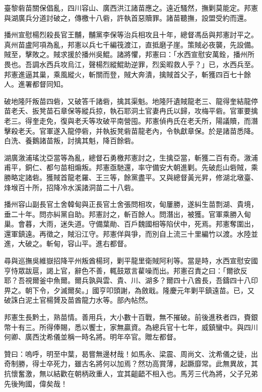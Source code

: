 \begin{pinyinscope}
臺黎砦苗關保倡亂，四川容山、廣西洪江諸苗應之。遠近騷然，撫剿莫能定。邦憲與湖廣兵分道討破之，傳檄十八砦，許執首惡贖罪。諸苗聽撫，設盟受約而還。

播州宣慰楊烈殺長官王黼，黼黨李保等治兵相攻且十年，總督馮岳與邦憲討平之。真州苗盧阿項為亂，邦憲以兵七千編筏渡江，直抵磨子崖。策賊必夜襲，先設備。賊至，擊敗之。賊求援於播州吳鯤。諸將懼，邦憲曰：「水西宣慰安萬銓，播州所畏也。吾調水西兵攻烏江，聲楊烈縱鯤助逆罪，烈奚暇救人乎？」已，水西兵至。邦憲進逼其巢，乘風縱火，斬關而登，賊大奔潰，擒賊首父子，斬獲四百七十餘人。進署都督同知。

破地隆阡叛苗四砦，又破答千諸砦，擒其渠魁。地隆阡遺賊龍老三、龍得奎結龍停苗老夭、扳凳苗石章保等縱兵掠，執石耶洞土官妻冉氏以歸，攻梅平砦。官軍要擒老三。得奎走免，復與老夭等攻破平南營囤。邦憲偵冉氏在老夭所，陽議贖，而潛擊殺老夭。官軍遂入龍停砦，并執扳凳砦苗龍老內，令執獻章保。於是諸苗悉降。白洗、養鵝諸苗叛，討擒其魁，降百餘砦。

湖廣漵浦瑤沈亞當等為亂，總督石勇檄邦憲討之，生擒亞當，斬獲二百有奇。漵浦甫平，銅仁、都勻苗相煽叛。邦憲亟馳還，率守備安大朝進剿。先破彪山砦賊，乘勝略定諸砦。獲賊首龍老羅、王三等，餘黨盡平。又與總督黃光昇，修湖北墩臺、烽堠百十所，招降冷水溪諸洞苗二十八砦。

播州容山副長官土舍韓甸與正長官土舍張問相攻，甸屢勝，遂糾生苗剽湖、貴境，垂二十年。問亦糾黨自助。邦憲討之，斬百餘人。問潛出，被獲。官軍乘勝入甸巢。會暮，大雨，迷失道。守備葉勛、百戶魏國相等陷伏中，死焉。邦憲奪圍出，還軍鎮遠。再徵之，賊沿江守。邦憲佯與爭，而別自上流三十里編竹以渡。水陸並進，大破之。斬甸，容山平。進右都督。

尋與巡撫吳維嶽招降平州叛酋楊珂，剿平龍里衛賊阿利等。當是時，水西宣慰安國亨恃眾跋扈，謁上官，辭色不善，輒鼓眾言雚噪而出。邦憲召責之曰：「爾欲反耶？吾視爾釜中魚爾。爾兵孰與雲、貴、川、湖多？爾四十八酋長，吾鑄四十八印畀之。朝下令，夕滅爾矣。」國亨叩頭謝，為斂戢。隆慶元年剿平鎮遠苗。已，又破誅白泥土官楊贇及苗酋龍力水等。部內帖然。

邦憲生長黔土，熟苗情。善用兵，大小數十百戰，無不摧破。前後進秩者四，賚銀幣十有三。所得俸賜，悉以饗士，家無贏資。為總兵官十七年，威鎮蠻中。與四川何卿、廣西沈希儀並稱一時名將。明年卒官。贈左都督。

贊曰：嗚呼，明至中葉，曷嘗無邊材哉！如馬永、梁震、周尚文、沈希儀之徒，出奇制勝，得士卒死力，雖古名將何以加焉？然功高賞薄，起蹶靡常。此無異故，其抗懷奮激，無以結歡在朝柄政重人，宜其齟齬不相入也。馬芳三代為將，父子兄弟先後殉國，偉矣哉！


\end{pinyinscope}
